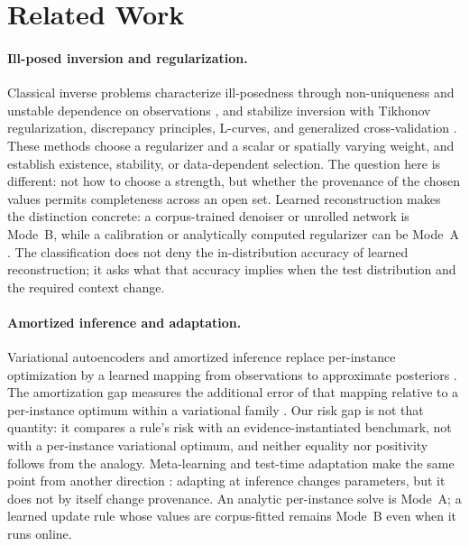 \documentclass[twoside,11pt]{article}
\begin{document}
\section{Related Work}
\label{ch:related}%

\paragraph{Ill-posed inversion and regularization.}
Classical inverse problems characterize ill-posedness through non-uniqueness and unstable dependence on observations \citep{hadamard1902}, and stabilize inversion with Tikhonov regularization, discrepancy principles, L-curves, and generalized cross-validation \citep{tikhonov1977,hansen1992,golub1979}. These methods choose a regularizer and a scalar or spatially varying weight, and establish existence, stability, or data-dependent selection. The question here is different: not how to choose a strength, but whether the provenance of the chosen values permits completeness across an open set. Learned reconstruction makes the distinction concrete: a corpus-trained denoiser or unrolled network is Mode~B, while a calibration or analytically computed regularizer can be Mode~A \citep{adler2018,ongie2020}. The classification does not deny the in-distribution accuracy of learned reconstruction; it asks what that accuracy implies when the test distribution and the required context change.

\paragraph{Amortized inference and adaptation.}
Variational autoencoders and amortized inference replace per-instance optimization by a learned mapping from observations to approximate posteriors \citep{kingma2014,rezende2014}. The amortization gap measures the additional error of that mapping relative to a per-instance optimum within a variational family \citep{cremer2018}. Our risk gap is not that quantity: it compares a rule's risk with an evidence-instantiated benchmark, not with a per-instance variational optimum, and neither equality nor positivity follows from the analogy. Meta-learning and test-time adaptation make the same point from another direction \citep{finn2017,hospedales2021,sun2020,liang2024}: adapting at inference changes parameters, but it does not by itself change provenance. An analytic per-instance solve is Mode~A; a learned update rule whose values are corpus-fitted remains Mode~B even when it runs online.
\end{document}
